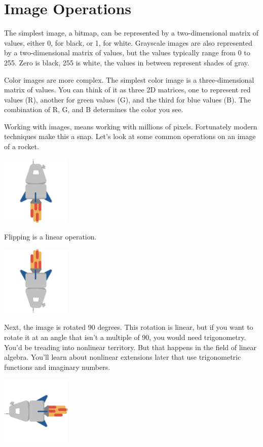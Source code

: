 \section{Image Operations}
The simplest image, a bitmap, can be represented by a two-dimensional matrix of values, either 0, for black, or 1, for white. Grayscale images are also represented by a two-dimensional matrix of values, but the values typically range from 0 to 255. Zero is black, 255 is white, the values in between represent shades of gray. 

Color images are more complex. The simplest color image is a three-dimensional matrix of values. You can think of it as three 2D matrices, one to represent red values (R), another for green values (G), and the third for blue values (B). The combination of R, G, and B determines the color you see.

Working with images, means working with millions of pixels. Fortunately modern techniques make this a snap. Let's look at some common operations on an image of a rocket.

\includegraphics[width=0.25\textwidth]{flying-rocket.png}

Flipping is a linear operation.

\includegraphics[width=0.25\textwidth]{rocket-flipped.png}

Next, the image is rotated 90 degrees. This rotation is linear, but if you want to rotate it at an angle that isn't a multiple of 90, you would need trigonometry. You'd be treading into nonlinear territory. But that happens in the field of linear algebra. You'll learn about nonlinear extensions later that use trigonometric functions and imaginary numbers.

\includegraphics[width=0.25\textwidth]{rocket-rotated-90.png}

